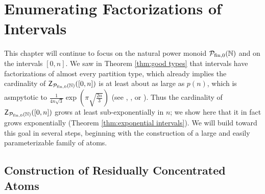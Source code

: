 \chapter{Enumerating Factorizations of Intervals} \label{ch:intervals}

This chapter will continue to focus on the natural power monoid ${\mathcal{P}_{\textrm{fin},0}(\mathbb{N})}$ and on the intervals $[0,n]$.
We saw in Theorem \ref{thm:good types} that intervals have factorizations of almost every partition type, which already implies the cardinality of $\mathsf{Z}_{\mathcal{P}_{\textrm{fin},0}(\mathbb{N})}([0,n])$ is at least about as large as $p(n)$, which is asmpytotic to $\frac{1}{4n\sqrt{3}} \exp\left(\pi\sqrt{\frac{2n}{3}}\right)$ (see \cite{hardy-ram18}, \cite{erdos42}, or \cite{nathanson02}).
Thus the cardinality of $\mathsf{Z}_{\mathcal{P}_{\textrm{fin},0}(\mathbb{N})}([0,n])$ grows at least sub-exponentially in $n$; we show here that it in fact grows exponentially (Theorem \ref{thm:exponential intervals}).
We will build toward this goal in several steps, beginning with the construction of a large and easily parameterizable family of atoms.


\section{Construction of Residually Concentrated Atoms}


